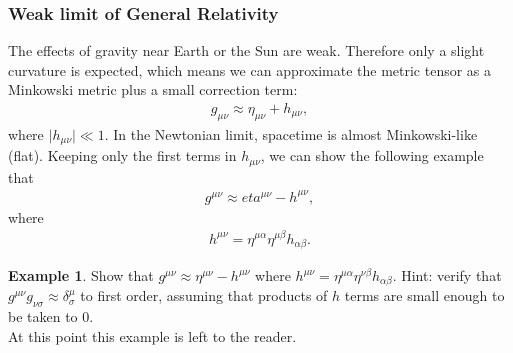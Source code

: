 \documentclass{article}
\theoremstyle{definition}
\newtheorem{exmp}{Example}[section]
\begin{document}
\subsubsection{Weak limit of General Relativity}
The effects of gravity near Earth or the Sun are weak. Therefore only a slight curvature is expected, which means we can approximate the metric tensor as a Minkowski metric plus a small correction term:
\begin{align*}
g_{\mu\nu} \approx \eta_{\mu\nu} + h_{\mu\nu},
\end{align*}
where $\vert h_{\mu\nu} \vert \ll 1$. In the Newtonian limit, spacetime is almost Minkowski-like (flat). Keeping only the first terms in $h_{\mu\nu}$, we can show the following example that 
\begin{align*}
g^{\mu\nu} \approx eta^{\mu\nu} - h^{\mu\nu},
\end{align*}
where 
\begin{align*}
h^{\mu\nu} = \eta^{\mu\alpha}\eta^{\mu\beta}h_{\alpha\beta}.
\end{align*}

\begin{exmp}
	Show that $g^{\mu\nu} \approx \eta^{\mu\nu} - h^{\mu\nu}$ where $h^{\mu\nu} = \eta^{\mu\alpha}\eta^{\nu\beta}h_{\alpha\beta}$. Hint: verify that $g^{\mu\nu}g_{\nu\sigma} \approx \delta^{\mu}_{\sigma} $ to first order, assuming that products of $h$ terms are small enough to be taken to 0.\\
	
	At this point this example is left to the reader.\\ 
\end{exmp}
\end{document}
